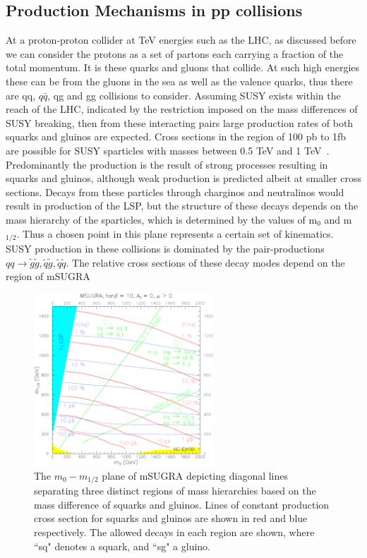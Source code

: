 \subsection{Production Mechanisms in pp collisions}
At a proton-proton collider at TeV energies such as the LHC, as discussed before we can consider the protons as a set of partons each carrying a fraction of the total momentum. It is these quarks and gluons that collide. At such high energies these can be from the gluons in the sea as well as the valence quarks, thus there are qq, $q\bar{q}$, qg and gg collisions to consider.
Assuming SUSY exists within the reach of the LHC, indicated by the restriction imposed on the mass differences of SUSY breaking, then from these interacting pairs large production rates of both squarks and gluinos are expected. Cross sections in the region of 100 pb to 1fb are possible for SUSY sparticles with masses between 0.5 TeV and 1 TeV~\cite{early}. Predominantly the production is the result of strong processes resulting in squarks and gluinos, although weak production is predicted albeit at smaller cross sections. Decays from these particles through charginos and neutralinos would result in production of the LSP, but the structure of these decays depends on the mass hierarchy of the sparticles, which is determined by the values of m$_{0}$ and m$_{1/2}$.  Thus a chosen point in this plane represents a certain set of kinematics. SUSY production in these collisions is dominated by the pair-productions $ qq \rightarrow \tilde{g} \tilde{g}, \tilde{q}\tilde{g}, \tilde{q} \tilde{q}$. The relative cross sections of these decay modes depend on the region of mSUGRA 

\begin{figure}
\centering
\includegraphics[width=0.6\textwidth]{Figures/Theory/mSUGRA_TDR_1}
\caption[The $m_{0}-m_{1/2}$ plane of mSUGRA depicting diagonal lines separating three distinct regions of mass hierarchies based on the mass difference of squarks and gluinos. ]{\label{fig:msugratdr}The $m_{0}-m_{1/2}$ plane of mSUGRA depicting diagonal lines separating three distinct regions of mass hierarchies based on the mass difference of squarks and gluinos. Lines of constant production cross section for squarks and gluinos are shown in red and blue respectively. The allowed decays in each region are shown, where ``sq" denotes a squark, and ``sg" a gluino.\cite{CMSTDRII}}

\end{figure}

